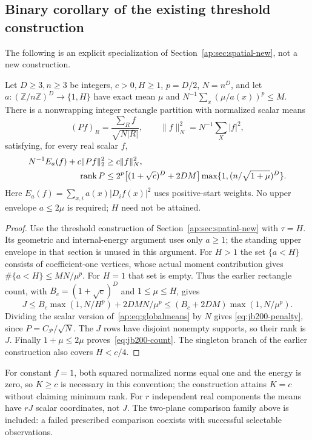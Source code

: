\subsection{Binary corollary of the existing threshold construction}
The following is an explicit specialization of
Section~\ref{ap:sec:spatial-new}, not a new construction.
\begin{proposition}\label{thm:jb200-binary}
Let $D\ge3,n\ge3$ be integers, $c>0,H\ge1$, $p=D/2$, $N=n^D$,
and let $a:(\mathbb Z/n\mathbb Z)^D\to\{1,H\}$ have exact mean $\mu$
and $N^{-1}\sum_x(\mu/a(x))^p\le M$. There is a nonwrapping integer
rectangle partition with normalized scalar means
\[
 (Pf)_R=\frac{\sum_R f}{\sqrt{N|R|}},\qquad
 \|f\|_N^2=N^{-1}\sum_X|f|^2,
\]
satisfying, for every real scalar $f$,
\begin{align}
 N^{-1}E_a(f)+c\|Pf\|_2^2&\ge c\|f\|_N^2,\label{eq:jb200-penalty}\\
 \operatorname{rank} P&\le2^p\big[(1+\sqrt c)^D+2DM\big]
 \max\{1,(n/\sqrt{1+\mu})^D\}.\label{eq:jb200-count}
\end{align}
Here $E_a(f)=\sum_{x,i}a(x)|D_if(x)|^2$ uses positive-start weights.
No upper envelope $a\le2\mu$ is required; $H$ need not be attained.
\end{proposition}
\begin{proof}
Use the threshold construction of Section~\ref{ap:sec:spatial-new} with
$\tau=H$. Its geometric and internal-energy argument uses only $a\ge1$;
the standing upper envelope in that section is unused in this argument.
For $H>1$ the set $\{a<H\}$ consists of coefficient-one vertices, whose
actual moment contribution gives $\#\{a<H\}\le MN/\mu^p$.
For $H=1$ that set is empty. Thus the earlier rectangle count, with
$B_c=(1+\sqrt c)^D$ and $1\le\mu\le H$, gives
\[
 J\le B_c\max(1,N/H^p)+2DMN/\mu^p
 \le(B_c+2DM)\max(1,N/\mu^p).
\]
Dividing the scalar version of~\eqref{ap:eq:globalmeans} by $N$ gives
\eqref{eq:jb200-penalty}, since $P=C_{\mathcal P}/\sqrt N$.
The $J$ rows have disjoint nonempty supports, so their rank is $J$.
Finally $1+\mu\le2\mu$ proves~\eqref{eq:jb200-count}.
The singleton branch of the earlier construction also covers $H<c/4$.
\end{proof}
For constant $f=1$, both squared normalized norms equal one and the energy
is zero, so $K\ge c$ is necessary in this convention; the construction
attains $K=c$ without claiming minimum rank. For $r$ independent real
components the means have $rJ$ scalar coordinates, not $J$.
The two-plane comparison family above is included: a failed prescribed
comparison coexists with successful selectable observations.


